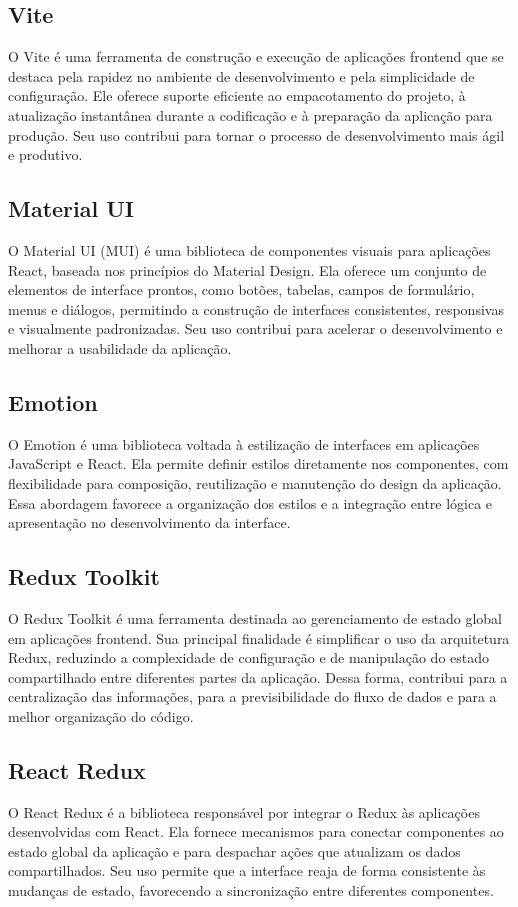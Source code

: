 \subsection{Vite}
O Vite é uma ferramenta de construção e execução de aplicações frontend que se destaca pela rapidez no ambiente de desenvolvimento e pela simplicidade de configuração. Ele oferece suporte eficiente ao empacotamento do projeto, à atualização instantânea durante a codificação e à preparação da aplicação para produção. Seu uso contribui para tornar o processo de desenvolvimento mais ágil e produtivo.

\subsection{Material UI}
O Material UI (MUI) é uma biblioteca de componentes visuais para aplicações React, baseada nos princípios do Material Design. Ela oferece um conjunto de elementos de interface prontos, como botões, tabelas, campos de formulário, menus e diálogos, permitindo a construção de interfaces consistentes, responsivas e visualmente padronizadas. Seu uso contribui para acelerar o desenvolvimento e melhorar a usabilidade da aplicação.

\subsection{Emotion}
O Emotion é uma biblioteca voltada à estilização de interfaces em aplicações JavaScript e React. Ela permite definir estilos diretamente nos componentes, com flexibilidade para composição, reutilização e manutenção do design da aplicação. Essa abordagem favorece a organização dos estilos e a integração entre lógica e apresentação no desenvolvimento da interface.

\subsection{Redux Toolkit}
O Redux Toolkit é uma ferramenta destinada ao gerenciamento de estado global em aplicações frontend. Sua principal finalidade é simplificar o uso da arquitetura Redux, reduzindo a complexidade de configuração e de manipulação do estado compartilhado entre diferentes partes da aplicação. Dessa forma, contribui para a centralização das informações, para a previsibilidade do fluxo de dados e para a melhor organização do código.

\subsection{React Redux}
O React Redux é a biblioteca responsável por integrar o Redux às aplicações desenvolvidas com React. Ela fornece mecanismos para conectar componentes ao estado global da aplicação e para despachar ações que atualizam os dados compartilhados. Seu uso permite que a interface reaja de forma consistente às mudanças de estado, favorecendo a sincronização entre diferentes componentes.

